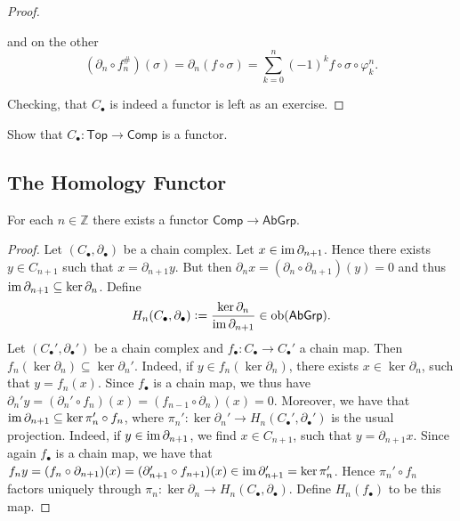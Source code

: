 \begin{proof}
\begin{enumerate}[label = \textit{Step \arabic*:},wide = 0pt, itemsep = 1.5ex]
\begin{equation*}
			\end{equation*}
			\noindent and on the other
			\begin{equation*}
				(\partial_n \circ f^\#_n)(\sigma) = \partial_n(f \circ \sigma) = \sum_{k = 0}^n (-1)^k f \circ \sigma \circ \varphi^n_k.
			\end{equation*}
	\end{enumerate}
	Checking, that $C_\bullet$ is indeed a functor is left as an exercise.
\end{proof}

\begin{exercise}
	Show that $C_\bullet : \mathsf{Top} \to \mathsf{Comp}$ is a functor.
\end{exercise}

\subsection*{The Homology Functor}
\begin{proposition}
	For each $n \in \mathbb{Z}$ there exists a functor $\mathsf{Comp} \to \mathsf{AbGrp}$.
	\label{prop:homology_functor}
\end{proposition}

\begin{proof}
	Let $(C_\bullet,\partial_\bullet)$ be a chain complex. Let $x \in \operatorname{im} \partial_{n + 1}$. Hence there exists $y \in C_{n + 1}$ such that $x = \partial_{n + 1}y$. But then $\partial_nx = (\partial_n \circ \partial_{n + 1})(y) = 0$ and thus $\operatorname{im} \partial_{n + 1} \subseteq \ker \partial_n$. Define
	\begin{equation*}
		H_n(C_\bullet,\partial_\bullet) := \frac{\ker \partial_n}{\operatorname{im} \partial_{n + 1}} \in \operatorname{ob}(\mathsf{AbGrp}).
	\end{equation*}
	Let $(C_\bullet',\partial_\bullet')$ be a chain complex and $f_\bullet : C_\bullet \to C_\bullet'$ a chain map. Then $f_n(\ker\partial_n) \subseteq \ker \partial_n'$. Indeed, if $y \in f_n(\ker\partial_n)$, there exists $x \in \ker\partial_n$, such that $y = f_n(x)$. Since $f_\bullet$ is a chain map, we thus have $\partial_n'y = (\partial_n' \circ f_n)(x) = (f_{n - 1} \circ \partial_n)(x) = 0$. Moreover, we have that $\operatorname{im} \partial_{n + 1} \subseteq \ker \pi_n' \circ f_n$, where $\pi_n' : \ker \partial_n' \to H_n(C_\bullet',\partial_\bullet')$ is the usual projection. Indeed, if $y \in \operatorname{im} \partial_{n + 1}$, we find $x \in C_{n + 1}$, such that $y = \partial_{n + 1}x$. Since again $f_\bullet$ is a chain map, we have that $f_ny = (f_n \circ \partial_{n + 1})(x) = (\partial_{n + 1}' \circ f_{n + 1})(x) \in \operatorname{im} \partial_{n + 1}' = \ker \pi_n'$. Hence $\pi_n' \circ f_n$ factors uniquely through $\pi_n : \ker \partial_n \to H_n(C_\bullet,\partial_\bullet)$. Define $H_n(f_\bullet)$ to be this map. 
\end{proof}

